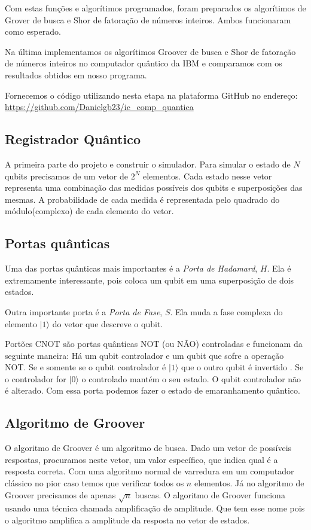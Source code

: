 \documentclass[12pt,a4paper]{article}
\begin{document}
Com estas funções e algorítimos programados, foram preparados os algorítimos de Grover de busca e Shor de fatoração de números inteiros. Ambos funcionaram como esperado. 

Na última implementamos os algorítimos Groover de busca e Shor de fatoração de números inteiros no computador quântico da IBM e comparamos com os resultados obtidos em nosso programa.

Fornecemos o código utilizando nesta etapa na plataforma GitHub no endereço: \url{https://github.com/Danielgb23/ic_comp_quantica}

\subsection{Registrador Quântico}
A primeira parte do projeto e construir o simulador. Para simular o estado de $N$ qubits precisamos de um vetor de  $2^{N}$ elementos. Cada estado nesse vetor representa uma combinação das medidas possíveis dos qubits e superposições das mesmas. A probabilidade de cada medida é representada pelo quadrado do módulo(complexo) de cada elemento do vetor.

\subsection{Portas quânticas}
Uma das portas quânticas mais importantes é a \textit{Porta de Hadamard}, $H$. Ela é extremamente interessante, pois coloca um qubit em uma superposição de dois estados. 

Outra importante porta é a \textit{Porta de Fase}, $S$.  Ela muda a fase complexa do elemento $|1\rangle$ do vetor que descreve o qubit.


 Portões CNOT são portas quânticas NOT (ou NÃO) controladas e funcionam da seguinte maneira: Há um qubit controlador e um qubit que sofre a operação NOT. Se e somente se o qubit controlador é $|1\rangle$ que o outro qubit é invertido . Se o controlador for $|0\rangle$ o controlado mantém o seu estado. O qubit controlador não é alterado. Com essa porta podemos fazer o estado de emaranhamento quântico.
 



\subsection{Algoritmo de Groover}
O algoritmo de Groover é um algoritmo de busca. Dado um vetor de possíveis respostas,  procuramos neste vetor, um valor específico, que indica qual é a resposta correta. 
Com uma algoritmo normal de varredura em um computador clássico no pior caso temos que verificar todos os $n$ elementos. Já no algoritmo de Groover precisamos de apenas $\sqrt{n}$ buscas.
O algoritmo de Groover funciona usando uma técnica chamada amplificação de amplitude. Que tem esse nome pois o algoritmo amplifica a amplitude da resposta no vetor de estados.
\end{document}
